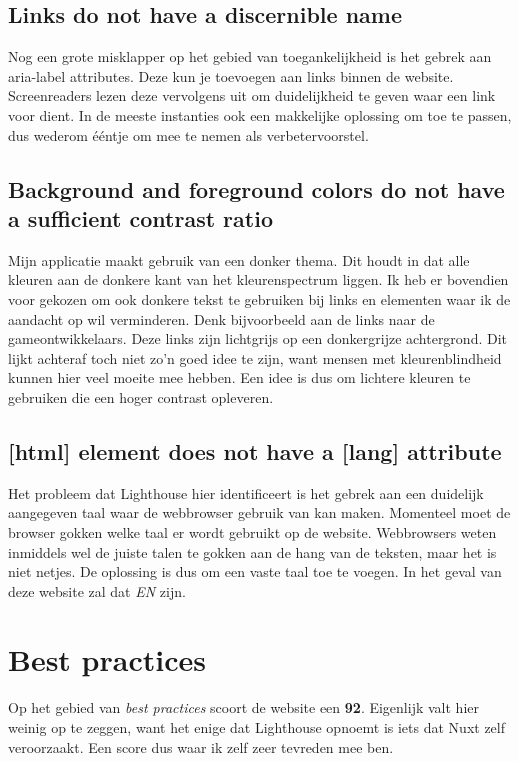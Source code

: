 \documentclass[a4paper]{report}
\begin{document}
    \subsection{Links do not have a discernible name}
    Nog een grote misklapper op het gebied van toegankelijkheid is het gebrek aan {\selectfont aria-label} attributes.
    Deze kun je toevoegen aan links binnen de website. Screenreaders lezen deze vervolgens uit om duidelijkheid te geven waar een link voor dient.
    In de meeste instanties ook een makkelijke oplossing om toe te passen, dus wederom ééntje om mee te nemen als verbetervoorstel.

    \subsection{Background and foreground colors do not have a sufficient contrast ratio}
    Mijn applicatie maakt gebruik van een donker thema. Dit houdt in dat alle kleuren aan de donkere kant van het kleurenspectrum liggen.
    Ik heb er bovendien voor gekozen om ook donkere tekst te gebruiken bij links en elementen waar ik de aandacht op wil verminderen.
    Denk bijvoorbeeld aan de links naar de gameontwikkelaars. Deze links zijn lichtgrijs op een donkergrijze achtergrond. Dit lijkt achteraf
    toch niet zo'n goed idee te zijn, want mensen met kleurenblindheid kunnen hier veel moeite mee hebben. Een idee is dus om lichtere kleuren te gebruiken die een hoger contrast opleveren.

    \subsection{[html] element does not have a [lang] attribute}
    Het probleem dat Lighthouse hier identificeert is het gebrek aan een duidelijk aangegeven taal waar de webbrowser gebruik van kan maken.
    Momenteel moet de browser gokken welke taal er wordt gebruikt op de website. Webbrowsers weten inmiddels wel de juiste talen te gokken aan de hang van de teksten,
    maar het is niet netjes. De oplossing is dus om een vaste taal toe te voegen. In het geval van deze website zal dat \textit{EN} zijn.

    \section{Best practices}
    Op het gebied van \textit{best practices} scoort de website een \textbf{92}.
    Eigenlijk valt hier weinig op te zeggen, want het enige dat Lighthouse opnoemt is iets dat Nuxt zelf veroorzaakt.
    Een score dus waar ik zelf zeer tevreden mee ben.
\end{document}
